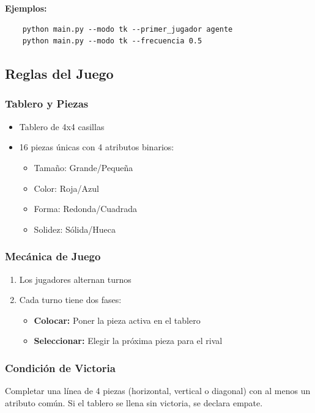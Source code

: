 \documentclass[conference]{IEEEtran}
\begin{document}
\textbf{Ejemplos:}
\begin{verbatim}
	python main.py --modo tk --primer_jugador agente
	python main.py --modo tk --frecuencia 0.5
\end{verbatim}

\subsection{Reglas del Juego}

\subsubsection{Tablero y Piezas}
\begin{itemize}
	\item Tablero de 4x4 casillas
	\item 16 piezas únicas con 4 atributos binarios:
	\begin{itemize}
		\item Tamaño: Grande/Pequeña
		\item Color: Roja/Azul
		\item Forma: Redonda/Cuadrada
		\item Solidez: Sólida/Hueca
	\end{itemize}
\end{itemize}

\subsubsection{Mecánica de Juego}
\begin{enumerate}
	\item Los jugadores alternan turnos
	\item Cada turno tiene dos fases:
	\begin{itemize}
		\item \textbf{Colocar:} Poner la pieza activa en el tablero
		\item \textbf{Seleccionar:} Elegir la próxima pieza para el rival
	\end{itemize}
\end{enumerate}

\subsubsection{Condición de Victoria}
Completar una línea de 4 piezas (horizontal, vertical o diagonal) con al menos un atributo común. Si el tablero se llena sin victoria, se declara empate.
\end{document}
